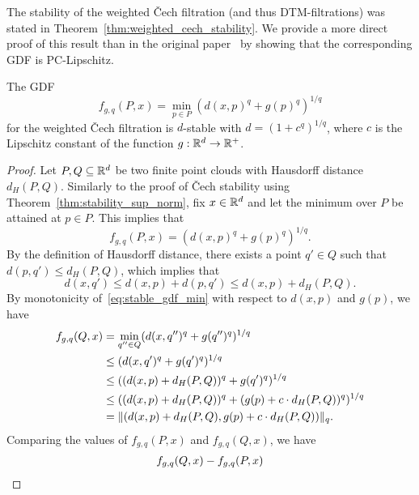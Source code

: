 The stability of the weighted \v{C}ech filtration (and thus DTM-filtrations) was
stated in Theorem~\ref{thm:weighted_cech_stability}. We provide a more direct
proof of this result than in the original paper~\cite{anai2020dtm} by showing
that the corresponding GDF is PC-Lipschitz.

\begin{theorem}
    The GDF
    \begin{equation}
        f_{g, q}(P, x) = \min_{p \in P} (d(x, p)^{q} + g(p)^{q})^{1/q}
    \end{equation}
    for the weighted \v{C}ech filtration is $d$-stable with
    $d = (1 + c^q)^{1/q}$, where $c$ is the Lipschitz constant of the
    function $g : \mathbb{R}^d \to \mathbb{R}^+$.
\end{theorem}
\begin{proof}
    Let $P, Q \subseteq \mathbb{R}^d$ be two finite point clouds with Hausdorff distance
    $d_H(P, Q)$. Similarly to the proof of \v{C}ech stability using
    Theorem~\ref{thm:stability_sup_norm}, fix $x \in \mathbb{R}^d$ and let the minimum
    over $P$ be attained at $p \in P$. This implies that
    \begin{equation}
        \label{eq:stable_gdf_min}
        f_{g, q}(P, x) = (d(x, p)^q + g(p)^q)^{1/q}.
    \end{equation}
    By the definition of Hausdorff distance, there exists a point $q' \in Q$
    such that $d(p, q') \leq d_H(P, Q)$, which implies that
    \begin{equation}
        d(x, q') \leq d(x, p) + d(p, q') \leq d(x, p) + d_H(P, Q).
    \end{equation}
    By monotonicity of~\eqref{eq:stable_gdf_min} with respect to $d(x, p)$ and
    $g(p)$, we have
    \begin{align}
        f_{g, q}(Q, x)
        & = \min_{q'' \in Q} (d(x, q'')^q + g(q'')^q)^{1/q} \\
        & \leq (d(x, q')^q + g(q')^q)^{1/q} \\
        & \leq ((d(x, p) + d_H(P, Q))^q + g(q')^q)^{1/q} \\
        & \leq ((d(x, p) + d_H(P, Q))^q + (g(p) + c \cdot d_H(P, Q))^q)^{1/q} \\
        & = \lVert(d(x, p) + d_H(P, Q), g(p) + c \cdot d_H(P, Q))\rVert_q.
    \end{align}
    Comparing the values of $f_{g, q}(P, x)$ and $f_{g, q}(Q, x)$, we have
    \begin{align}
        & f_{g, q}(Q, x) - f_{g, q}(P, x) \notag \\

\end{align}
\end{proof}
